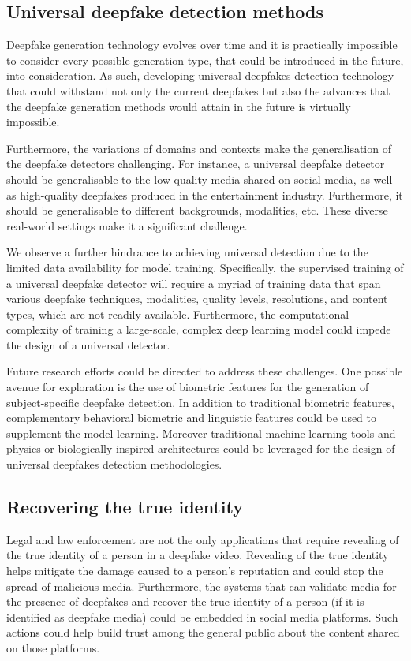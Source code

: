 \subsection{Universal deepfake detection methods}
Deepfake generation technology evolves over time and it is practically impossible to consider every possible generation type, that could be introduced in the future, into consideration. As such, developing universal deepfakes detection technology that could withstand not only the current deepfakes but also the advances that the deepfake generation methods would attain in the future is virtually impossible. 

Furthermore, the variations of domains and contexts make the generalisation of the deepfake detectors challenging. For instance, a universal deepfake detector should be generalisable to the low-quality media shared on social media, as well as high-quality deepfakes produced in the entertainment industry. Furthermore, it should be generalisable to different backgrounds, modalities, etc. These diverse real-world settings make it a significant challenge. 

We observe a further hindrance to achieving universal detection due to the limited data availability for model training. Specifically, the supervised training of a universal deepfake detector will require a myriad of training data that span various deepfake techniques, modalities, quality levels, resolutions, and content types, which are not readily available. Furthermore, the computational complexity of training a large-scale, complex deep learning model could impede the design of a universal detector. 

Future research efforts could be directed to address these challenges. One possible avenue for exploration is the use of biometric features for the generation of subject-specific deepfake detection. In addition to traditional biometric features, complementary behavioral biometric and linguistic features could be used to supplement the model learning. Moreover traditional machine learning tools and physics or biologically inspired architectures could be leveraged for the design of universal deepfakes detection methodologies.

\subsection{Recovering the true identity}

Legal and law enforcement are not the only applications that require revealing of the true identity of a person in a deepfake video. Revealing of the true identity helps mitigate the damage caused to a person's reputation and could stop the spread of malicious media. Furthermore, the systems that can validate media for the presence of deepfakes and recover the true identity of a person (if it is identified as deepfake media) could be embedded in social media platforms. Such actions could help build trust among the general public about the content shared on those platforms. 

